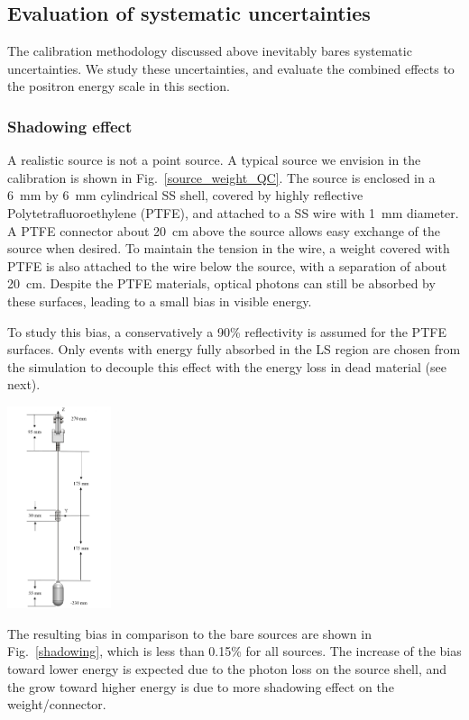 \documentclass[a4paper,10pt,twoside]{cpc-hepnp}
\begin{document}
\begin{CJK*}{GB}{gbsn}
\begin{multicols}{2}
\subsection{Evaluation of systematic uncertainties}
\label{sec:sys}
The calibration methodology discussed above inevitably bares
systematic uncertainties. We study these uncertainties, and evaluate
the combined effects to the positron energy scale in this section.

\subsubsection{Shadowing effect}
A realistic source is not a point source. A typical source we
envision in the calibration is shown in
Fig.~\ref{source_weight_QC}. The source is enclosed in a 6~mm by 6~mm
cylindrical SS shell, covered by highly reflective
Polytetrafluoroethylene (PTFE), and attached to a SS wire with 1~mm
diameter.
A PTFE connector about 20~cm above the source allows easy exchange of
the source when desired. To maintain the tension in the wire, a weight
covered with PTFE is also attached to the wire below the source, with
a separation of about 20~cm. Despite the PTFE materials, optical
photons can still be absorbed by these surfaces, leading to a small
bias in visible energy.


To study this bias, a conservatively a 90\% reflectivity is assumed
for the PTFE surfaces. Only events with energy fully absorbed in the
LS region are chosen from the simulation to decouple this effect with
the energy loss in dead material (see next). 

\begin{center}
  \centering
  \includegraphics[width=1.2in]{source_weight_QC.png}
  \label{source_weight_QC}
\end{center}
The resulting bias in
comparison to the bare sources are shown in Fig.~\ref{shadowing}, which is
less than 0.15\% for all sources. The increase of the bias toward
lower energy is expected due to the photon loss on the source shell,
and the grow toward higher energy is due to more shadowing effect on
the weight/connector.



\end{multicols}
\end{CJK*}
\end{document}
